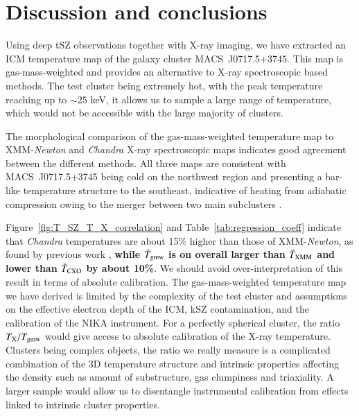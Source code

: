 \documentclass[twocolumn,traditabstract]{aa}
\begin{document}
\section{Discussion and conclusions}\label{sec:conclusions}
Using deep tSZ observations together with X-ray imaging, we have extracted an ICM temperature map of the galaxy cluster \mbox{MACS~J0717.5+3745}. This map is gas-mass-weighted and provides an alternative to X-ray spectroscopic based methods. The test cluster being extremely hot, with the peak temperature reaching up to $\sim 25$ keV, it allows us to sample a large range of temperature, which would not be accessible with the large majority of clusters.

The morphological comparison of the gas-mass-weighted temperature map to XMM-\textit{Newton} and \textit{Chandra} X-ray spectroscopic maps indicates good agreement between the different methods. All three maps are consistent with \mbox{MACS~J0717.5+3745} being cold on the northwest region and presenting a bar-like temperature structure to the southeast, indicative of heating from adiabatic compression owing to the merger between two main subclusters \citep[see, e.g.,][]{Ma2009}.

Figure~\ref{fig:T_SZ_T_X_correlation} and Table~\ref{tab:regression_coeff} indicate that \textit{Chandra} temperatures are about 15\% higher than those of XMM-\textit{Newton}, as found by previous work \citep{Mahdavi2013,sch15}, {\bf while $\bar{T}_{\rm gmw}$ is on overall larger than $\bar{T}_{\rm XMM}$ and lower than $\bar{T}_{\rm CXO}$ by about 10\%}. We should avoid over-interpretation of this result in terms of absolute calibration. The gas-mass-weighted temperature map we have derived is limited by the complexity of the test cluster and  assumptions on the effective electron depth of the ICM, kSZ contamination, and the calibration of the NIKA instrument. For a perfectly spherical cluster, the ratio $T_{\rm X} / T_{\rm gmw}$ would give access to absolute calibration of the X-ray temperature. Clusters being complex objects, the ratio we really measure is a complicated combination of the 3D temperature structure and intrinsic properties affecting the density such as amount of substructure, gas clumpiness and triaxiality. A larger sample would allow us to disentangle instrumental calibration from effects linked to intrinsic cluster properties.
\end{document}
